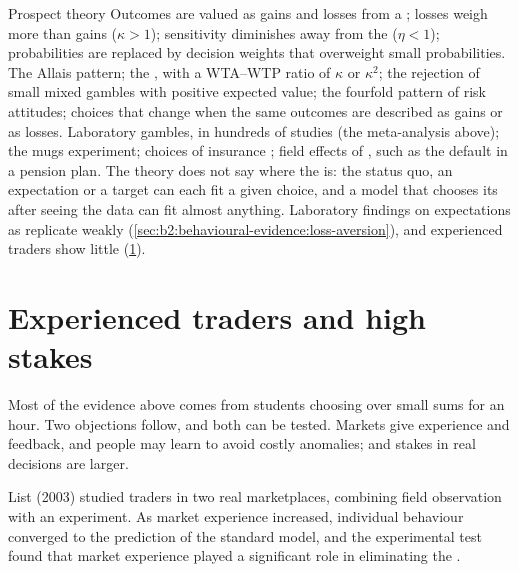 \begin{model}{Prospect theory}
\assumes Outcomes are valued as gains and losses from a ; losses weigh more than gains
($\kappa > 1$); sensitivity diminishes away from the  ($\eta < 1$); probabilities are
replaced by decision weights that overweight small probabilities.
\predicts The Allais pattern; the , with a WTA--WTP ratio of $\kappa$ or $\kappa^2$; the
rejection of small mixed gambles with positive expected value; the fourfold pattern of risk attitudes;
choices that change when the same outcomes are described as gains or as losses.
\tested Laboratory gambles, in hundreds of studies (the meta-analysis above); the mugs experiment;
choices of insurance ; field effects of , such as the default in a pension
plan.
\breaks The theory does not say where the  is: the status quo, an expectation or a
target can each fit a given choice, and a model that chooses its  after seeing the data
can fit almost anything. Laboratory findings on expectations as  replicate weakly
(\cref{sec:b2:behavioural-evidence:loss-aversion}), and experienced traders show little  (\cref{sec:b2:behavioural-evidence:experience}).
\end{model}

\section{Experienced traders and high stakes}\label{sec:b2:behavioural-evidence:experience}

Most of the evidence above comes from students choosing over small sums for an hour. Two objections
follow, and both can be tested. Markets give experience and feedback, and people may learn to avoid
costly anomalies; and stakes in real decisions are larger.

\begin{record}
List (2003) studied traders in two real marketplaces, combining field observation with an
experiment. As market experience increased, individual behaviour converged to the prediction of the
standard model, and the experimental test found that market experience played a significant role in
eliminating the .
\end{record}

